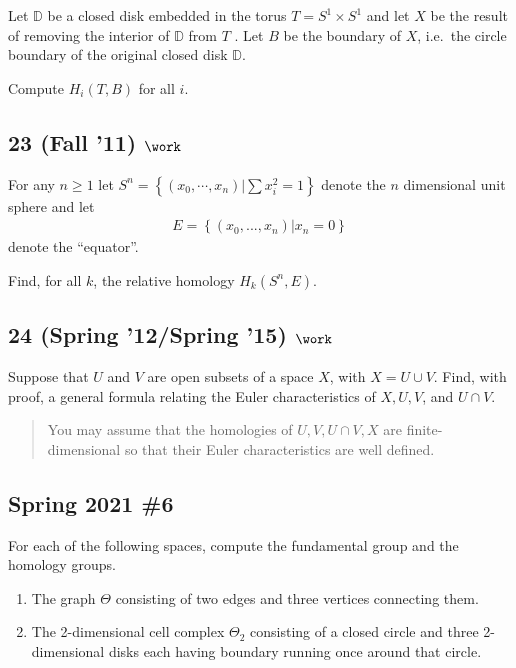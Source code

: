 Let \({\mathbb{D}}\) be a closed disk embedded in the torus
\(T = S^1 \times S^1\) and let \(X\) be the result of removing the
interior of \({\mathbb{D}}\) from \(T\) . Let \(B\) be the boundary of
\(X\), i.e.~the circle boundary of the original closed disk
\({\mathbb{D}}\).

Compute \(H_i (T, B)\) for all \(i\).

\hypertarget{fall-11-work-1}{%
\subsection{\texorpdfstring{23 (Fall '11)
\(\work\)}{23 (Fall '11) \textbackslash work}}\label{fall-11-work-1}}

For any \(n \geq 1\) let
\(S^n = \left\{{(x_0 , \cdots , x_n )\mathrel{\Big|}\sum x_i^2 =1}\right\}\)
denote the \(n\) dimensional unit sphere and let
\begin{align*}E = \left\{{(x_0 , . . . , x_n )\mathrel{\Big|}x_n = 0}\right\}\end{align*}
denote the ``equator''.

Find, for all \(k\), the relative homology \(H_k (S^n , E)\).

\hypertarget{spring-12spring-15-work}{%
\subsection{\texorpdfstring{24 (Spring '12/Spring '15)
\(\work\)}{24 (Spring '12/Spring '15) \textbackslash work}}\label{spring-12spring-15-work}}

Suppose that \(U\) and \(V\) are open subsets of a space \(X\), with
\(X = U \cup V\). Find, with proof, a general formula relating the Euler
characteristics of \(X, U, V\), and \(U \cap V\).

\begin{quote}
You may assume that the homologies of \(U, V, U \cap V, X\) are
finite-dimensional so that their Euler characteristics are well defined.
\end{quote}

\hypertarget{spring-2021-6}{%
\subsection{Spring 2021 \#6}\label{spring-2021-6}}

\begin{problem}[Spring 2021, 6]

For each of the following spaces, compute the fundamental group and the
homology groups.

\begin{enumerate}
\def\labelenumi{\alph{enumi}.}
\item
  The graph \(\Theta\) consisting of two edges and three vertices
  connecting them.
\item
  The 2-dimensional cell complex \(\Theta_2\) consisting of a closed
  circle and three 2-dimensional disks each having boundary running once
  around that circle.
\end{enumerate}

\end{problem}

